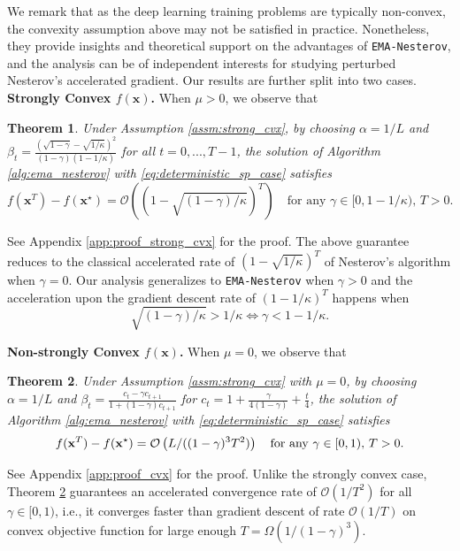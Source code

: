 \documentclass{article}
\theoremstyle{plain}
\newtheorem{theorem}{Theorem}
\theoremstyle{definition}
\theoremstyle{remark}
\def\algname{{\tt EMA-Nesterov}}
\def\bx{\mathbf{x}}
\begin{document}
We remark that as the deep learning training problems are typically non-convex, the convexity assumption above may not be satisfied in practice. Nonetheless, they provide insights and theoretical support on the advantages of {\algname}, and the analysis can be of independent interests for studying perturbed Nesterov's accelerated gradient.
Our results are further split into two cases. 
\textbf{Strongly Convex $f(\bx)$.}
When $\mu > 0$, we observe that
\begin{theorem}
    Under Assumption \ref{assm:strong_cvx}, by choosing $\alpha = 1/L$ and $\beta_t = \frac{\left(\sqrt{1 - \gamma} - \sqrt{1/\kappa}\right)^2}{(1-\gamma)(1-1/\kappa)}$ for all $t=0, ..., T-1$, the solution of  Algorithm \ref{alg:ema_nesterov} with \eqref{eq:deterministic_sp_case} satisfies
    \begin{equation}
        f(\bx^T) - f(\bx^\star) = \mathcal{O}\left((1 - \sqrt{(1-\gamma) / \kappa})^T\right) \quad \text{for any $\gamma \in [0, 1-1/\kappa)$, $T > 0$.}
    \end{equation}
\end{theorem}
See Appendix \ref{app:proof_strong_cvx} for the proof. The above guarantee reduces to the classical accelerated rate of $(1-\sqrt{1/\kappa})^T$ of Nesterov's algorithm when $\gamma = 0$. Our analysis generalizes to {\algname} when $\gamma > 0$ and the acceleration upon the gradient descent rate of $(1-1/\kappa)^T$ happens when
\begin{equation}
    \sqrt{(1-\gamma)/\kappa} > 1/\kappa \Leftrightarrow \gamma < 1- 1/\kappa.
\end{equation}

\textbf{Non-strongly Convex $f(\bx)$.} When $\mu = 0$, we observe that 
\begin{theorem} \label{thm:cvx}
    Under Assumption \ref{assm:strong_cvx} with $\mu = 0$, by choosing $\alpha = 1/L$ and $\beta_t = \frac{c_t - \gamma c_{t+1}}{1 + (1-\gamma) c_{t+1}}$ for $c_t = 1 + \frac{\gamma}{4(1-\gamma)} + \frac{t}{4}$, the solution of Algorithm \ref{alg:ema_nesterov} with \eqref{eq:deterministic_sp_case} satisfies
    \begin{equation}
        f(\bx^T) - f(\bx^\star) = {\cal O}\left(L / ( {(1-\gamma)^3T^2} ) \right) \quad \text{for any $\gamma \in [0, 1)$, $T > 0$.}
    \end{equation} 
\end{theorem}
See Appendix \ref{app:proof_cvx} for the proof. Unlike the strongly convex case, Theorem \ref{thm:cvx} guarantees an accelerated convergence rate of $\mathcal{O}(1/T^2)$ for all $\gamma \in [0, 1)$, i.e., it converges faster than gradient descent of rate $\mathcal{O}(1/T)$ on convex objective function for large enough $T = \Omega(1/(1-\gamma)^3)$.
\end{document}
